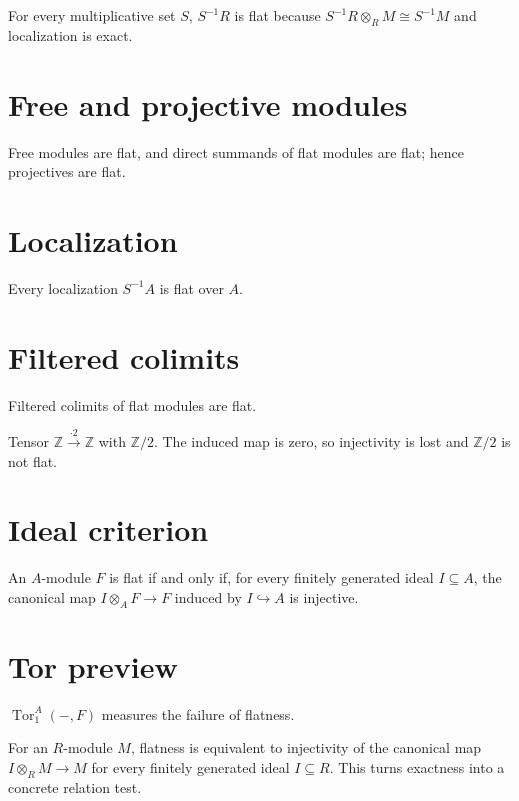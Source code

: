 \begin{example}\label{ex:v14-expand-01}
For every multiplicative set $S$, $S^{-1}R$ is flat because $S^{-1}R\otimes_RM\cong S^{-1}M$ and localization is exact.
\end{example}
\section{Free and projective modules}
Free modules are flat, and direct summands of flat modules are flat; hence projectives are flat.

\section{Localization}
Every localization $S^{-1}A$ is flat over $A$.

\section{Filtered colimits}
Filtered colimits of flat modules are flat.

\begin{example}\label{ex:v14-expand-02}
Tensor $\mathbb Z\xrightarrow{\cdot2}\mathbb Z$ with $\mathbb Z/2$. The induced map is zero, so injectivity is lost and $\mathbb Z/2$ is not flat.
\end{example}
\section{Ideal criterion}
An $A$-module $F$ is flat if and only if, for every finitely generated ideal $I\subseteq A$, the canonical map $I\otimes_A F\to F$ induced by $I\hookrightarrow A$ is injective.

\section{Tor preview}
$\operatorname{Tor}_1^A(-,F)$ measures the failure of flatness.

\begin{example}\label{ex:v14-expand-03}
For an $R$-module $M$, flatness is equivalent to injectivity of the canonical map $I\otimes_R M\to M$ for every finitely generated ideal $I\subseteq R$. This turns exactness into a concrete relation test.
\end{example}
